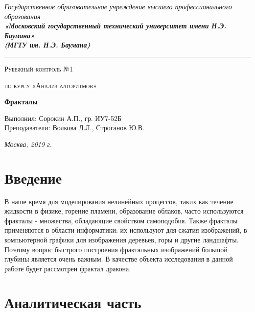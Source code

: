 \documentclass[12pt, a4paper]{report}
\begin{document}
    \begin{titlepage}

        \begin{center}
            \Large
            {\sl Государственное образовательное учреждение высшего профессионального образования\\
            {\bf«Московский государственный технический университет имени Н.Э. Баумана»\\
				(МГТУ им. Н.Э. Баумана)}}
				\noindent\rule{\textwidth}{2pt}
            \vspace{3cm}

			{\scshape\LARGE Рубежный контроль №1 \par}
			\vspace{0.5cm}	
			{\scshape\LARGE по курсу «Анализ алгоритмов» \par}
			\vspace{1.5cm}
			{\huge\bfseries Фракталы \par}
			\vspace{2cm}
			\Large Выполнил: Сорокин А.П., гр. ИУ7-52Б\\
			\vspace{0.5cm}
			{\Large Преподаватели: Волкова Л.Л., Строганов Ю.В.}
		
			\vfill
			\Large \textit {Москва, 2019 г.}
            
        \end{center}

    \end{titlepage}
	
	\tableofcontents

	\chapter*{Введение}
	В наше время для моделирования нелинейных процессов, таких как течение жидкости в физике, горение пламени, образование облаков, часто используются фракталы - множества, обладающие свойством самоподобия. Также фракталы применяются в области информатики: их используют для сжатия изображений, в компьютерной графики для изображения деревьев, горы и другие ландшафты. Поэтому вопрос быстрого построения фрактальных изображений большой глубины является очень важным. В качестве объекта исследования в данной работе будет рассмотрен фрактал дракона.
	

    \chapter{Аналитическая часть}
\end{document}
